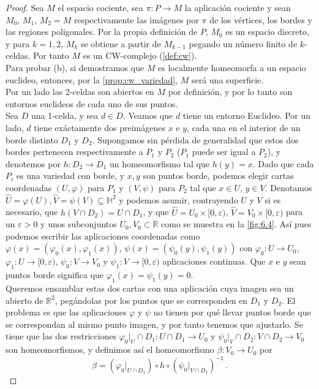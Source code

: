 \documentclass[10pt]{report}
\newcommand{\R}{\mathbb{R}}
\theoremstyle{definition}
\begin{document}
\begin{proof} 
Sea $M$ el espacio cociente, sea $\pi :P\to M$ la aplicación cociente y sean $M_0, \, M_1, \, M_2=M$ respectivamente las imágenes por $\pi$ de los vértices, los bordes y las regiones poligonales. Por la propia definición de $P$, $M_0$ es un espacio discreto, y para $k=1,2$, $M_k$ se obtiene a partir de $M_{k-1}$ pegando un número finito de $k$-celdas. Por tanto $M$ es un CW-complejo (\autoref{def:cw}).\\
Para probar (b), si demostramos que $M$ es localmente homeomorfa a un espacio euclideo, entonces, por la \autoref{prop:cw_variedad}, $M$ será una superficie.\\
Por un lado las 2-celdas son abiertos en $M$ por definición, y por lo tanto son entornos euclideos de cada uno de sus puntos.\\
Sea $D$ una 1-celda, y sea $d\in D$. Veamos que $d$ tiene un entorno Euclideo. Por un lado, $d$ tiene exáctamente dos preimágenes $x$ e $y$, cada una en el interior de un borde distinto $D_1$ y $D_2$. Supongamos sin pérdida de generalidad que estos dos bordes pertenecen respectivamente a $P_1$ y $P_2$ ($P_1$ puede ser igual a $P_2$), y denotemos por $h:D_2\to D_1$ un homeomorfismo tal que $h(y)=x$. Dado que cada $P_i$ es una variedad con borde, y $x,y$ son puntos borde, podemos elegir cartas coordenadas $(U,\varphi)$  para $P_1$ y $(V,\psi)$ para $P_2$ tal que $x\in U$, $y\in V$. Denotamos $\widehat{U}=\varphi(U),\widehat{V}=\psi(V)\subseteq \mathbb{H}^2$ y podemos asumir, contrayendo $U$ y $V$ si es necesario, que $h(V\cap D_2)=U\cap D_1$, y que $\widehat{U}=U_0\times [0,\varepsilon)$, $\widehat{V}=V_0\times [0,\varepsilon)$  para un $\varepsilon >0$ y unos subconjuntos $U_0, V_0 \subset \R$ como se muestra en la \autoref{fig:6.4}. Así pues podemos escribir las aplicaciones coordenadas como $\varphi(x)=(\varphi_0(x),\varphi_1(x))$, $\psi(x)=(\psi_0(y),\psi_1(y))$ con $\varphi_0:U\to U_0$, $\varphi_1:U\to [0,\varepsilon)$, $\psi_0:V\to V_0$ y $\psi_1:V\to [0,\varepsilon)$ aplicaciones continuas. Que $x$ e $y$ sean puntos borde significa que $\varphi_1(x)=\psi_1(y)=0$.\\
Queremos ensamblar estas dos cartas con una aplicación cuya imagen sea un abierto de $\R^2$, pegándolas por los puntos que se corresponden en $D_1$ y $D_2$. El problema es que las aplicaciones $\varphi$ y $\psi$ no tienen por qué llevar puntos borde que se correspondan al mismo punto imagen, y por tanto tenemos que ajustarlo. Se tiene que las dos restricciones $\varphi_0|_U\cap D_1: U\cap D_1\to U_0$ y $\psi_0|_V\cap D_2:V\cap D_2\to V_0$ son homeomorfismos, y definimos así el homeomorfismo $\beta:V_0\to U_0$ por $$\beta=(\varphi_0|_{U\cap D_1})\circ h\circ (\psi_0|_{V\cap D_2})^{-1}\, .$$ 

\end{proof}
\end{document}
